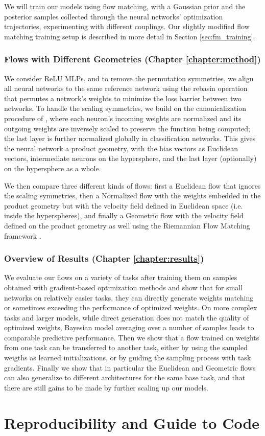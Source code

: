 We will train our models using flow matching, with a Gaussian prior and the posterior samples collected through the neural networks' optimization trajectories, experimenting with different couplings. Our slightly modified flow matching training setup is described in more detail in Section \ref{sec:fm_training}.

\subsubsection{Flows with Different Geometries (Chapter \ref{chapter:method})}

We consider ReLU MLPs, and to remove the permutation symmetries, we align all neural networks to the same reference network using the rebasin operation \citep{ainsworthGitReBasinMerging2023,penaReBasinImplicitSinkhorn2023} that permutes a network's weights to minimize the loss barrier between two networks. To handle the scaling symmetries, we build on the canonicalization procedure of \citep{pittorinoDeepNetworksToroids2022}, where each neuron's incoming weights are normalized and its outgoing weights are inversely scaled to preserve the function being computed; the last layer is further normalized globally in classification networks. This gives the neural network a product geometry, with the bias vectors as Euclidean vectors, intermediate neurons on the hypersphere, and the last layer (optionally) on the hypersphere as a whole. 

We then compare three different kinds of flows: first a Euclidean flow that ignores the scaling symmetries, then a Normalized flow with the weights embedded in the product geometry but with the velocity field defined in Euclidean space (i.e. inside the hyperspheres), and finally a Geometric flow with the velocity field defined on the product geometry as well using the Riemannian Flow Matching framework \citep{chenRiemannianFlowMatching2023}. 

\subsubsection{Overview of Results (Chapter \ref{chapter:results})}

We evaluate our flows on a variety of tasks after training them on samples obtained with gradient-based optimization methods and show that for small networks on relatively easier tasks, they can directly generate weights matching or sometimes exceeding the performance of optimized weights. On more complex tasks and larger models, while direct generation does not match the quality of optimized weights, Bayesian model averaging over a number of samples leads to comparable predictive performance. Then we show that a flow trained on weights from one task can be transferred to another task, either by using the sampled weigths as learned initializations, or by guiding the sampling process with task gradients. Finally we show that in particular the Euclidean and Geometric flows can also generalize to different architectures for the same base task, and that there are still gains to be made by further scaling up our models. 

\section{Reproducibility and Guide to Code}


